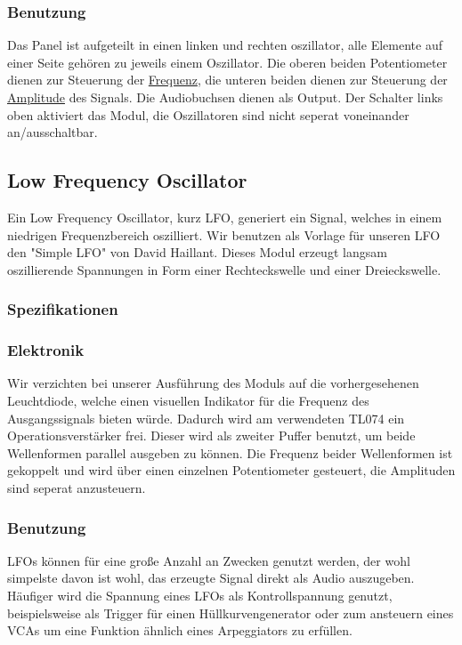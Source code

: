 \subsubsection{Benutzung}
\label{sec:org2aa0da3}
Das Panel ist aufgeteilt in einen linken und rechten oszillator, alle Elemente auf einer Seite gehören zu jeweils einem Oszillator. Die oberen beiden Potentiometer dienen zur Steuerung der \href{file:///home/felixp/Documents/diplomarbeit/dokumentation/content/theoretische\_grundlagen.org}{Frequenz}, die unteren beiden dienen zur Steuerung der \href{file:///home/felixp/Documents/diplomarbeit/dokumentation/content/theoretische\_grundlagen.org}{Amplitude} des Signals. Die Audiobuchsen dienen als Output. Der Schalter links oben aktiviert das Modul, die Oszillatoren sind nicht seperat voneinander an/ausschaltbar.

\subsection{Low Frequency Oscillator}
\label{sec:orgf05ee97}
Ein Low Frequency Oscillator, kurz LFO, generiert ein Signal, welches in einem niedrigen Frequenzbereich oszilliert. Wir benutzen als Vorlage für unseren LFO den "Simple LFO" von David Haillant. Dieses Modul erzeugt langsam oszillierende Spannungen in Form einer Rechteckswelle und einer Dreieckswelle.
\subsubsection{Spezifikationen}
\label{sec:orgb356ceb}
\subsubsection{Elektronik}
\label{sec:orgec27151}
Wir verzichten bei unserer Ausführung des Moduls auf die vorhergesehenen Leuchtdiode, welche einen visuellen Indikator für die Frequenz des Ausgangssignals bieten würde. Dadurch wird am verwendeten TL074 ein Operationsverstärker frei. Dieser wird als zweiter Puffer benutzt, um beide Wellenformen parallel ausgeben zu können. Die Frequenz beider Wellenformen ist gekoppelt und wird über einen einzelnen Potentiometer gesteuert, die Amplituden sind seperat anzusteuern.

\subsubsection{Benutzung}
\label{sec:org3aa9938}
LFOs können für eine große Anzahl an Zwecken genutzt werden, der wohl simpelste davon ist wohl, das erzeugte Signal direkt als Audio auszugeben. Häufiger wird die Spannung eines LFOs als Kontrollspannung genutzt, beispielsweise als Trigger für einen Hüllkurvengenerator oder zum ansteuern eines VCAs um eine Funktion ähnlich eines Arpeggiators zu erfüllen.

